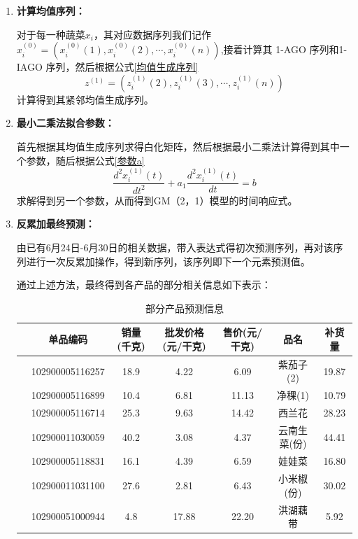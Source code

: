 \documentclass{my_paper}
\begin{document}
\begin{enumerate}
    \item \textbf{计算均值序列：}\par
对于每一种蔬菜$x_i$，其对应数据序列我们记作$x_i^{(0)}=\left(x_i^{(0)}(1), x_i^{(0)}(2), \cdots, x_i^{(0)}(n)\right)$,接着计算其 1-AGO 序列和1-IAGO 序列，然后根据公式\ref{均值生成序列}
\begin{equation}
    \label{均值生成序列}
    z^{(1)}=\left(z_i^{(1)}(2), z_i^{(1)}(3), \cdots, z_i^{(1)}(n)\right)
\end{equation}
计算得到其紧邻均值生成序列。
\item \textbf{最小二乘法拟合参数：}\par
首先根据其均值生成序列求得白化矩阵，然后根据最小二乘法计算得到其中一个参数，随后根据公式\ref{参数a}
\begin{equation}
    \label{参数a}
    \frac{d^2x_i^{(1)}(t)}{dt^2}+a_1\frac{d^2x_i^{(1)}(t)}{dt}=b
\end{equation}
求解得到另一个参数，从而得到GM（2，1）模型的时间响应式。
\item \textbf{反累加最终预测：}\par
由已有6月24日-6月30日的相关数据，带入表达式得初次预测序列，再对该序列进行一次反累加操作，得到新序列，该序列即下一个元素预测值。\par
通过上述方法，最终得到各产品的部分相关信息如下表示：
\begin{table}[H]
    \centering
    \caption{部分产品预测信息}
    \begin{tabular}{ccccccc}
    \toprule
         & 单品编码 & 销量(千克) & 批发价格(元/干克) & 售价(元/干克) &   品名 & 补货量 \\
    \midrule
    & 102900005116257 & 18.9 & 4.22 & 6.09  & 紫茄子(2) & 19.87 \\
     & 102900005116899 & 10.4 & 6.81 & 11.13  & 净稞(1) & 10.79 \\
     & 102900005116714 & 25.3 & 9.63 & 14.42  & 西兰花 & 28.23 \\
     & 102900011030059 & 40.2 & 3.08 & 4.37  & 云南生菜(份) & 44.41 \\
    & 102900005118831 & 16.1 & 4.39 & 6.59  &  娃娃菜 & 16.80 \\
    & 102900011031100 & 27.6 & 2.81 & 6.43  &  小米椒(份) & 30.02 \\
    & 102900051000944 & 4.8 & 17.88 & 22.20  &  洪湖藕带 & 5.92 \\
    \bottomrule
    \end{tabular}
\end{table}
\end{enumerate}
\end{document}
